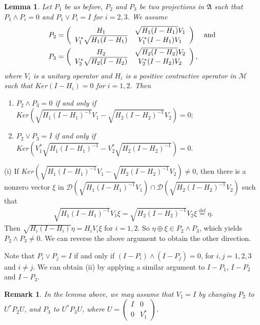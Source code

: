 \documentclass[12pt]{article}
\newtheorem{lemma}{Lemma}[section]
\newtheorem{remark}{Remark}[section]
\newcommand{\AAA}{\mathfrak A} \newcommand{\TTT}{\mathfrak T}
\newcommand{\DDD}{\mathcal D}
\newcommand{\MMM}{\mathcal M}
\begin{document}
{\begin{lemma}
Let $P_1$ be as before, $P_2$ and $P_3$ be two projections in $\AAA$
such that $P_1\wedge P_i=0$ and $P_1\vee P_i=I$ for $i=2,3$. We
assume
\begin{align*}
&P_2 = \left(\begin{array}{cc}H_1 & \sqrt{H_1 (I-H_1)}V_1 \\V_1^*
\sqrt{H_1 (I-H_1)} & V_1^{*}(I - H_1)V_1\end{array}\right)\,\,\,\,\,\hbox{ and }\\
&P_3 = \left(\begin{array}{cc}H_2 & \sqrt{H_2(I-H_2)}V_2 \\V_2^*
\sqrt{H_2(I-H_2)} & V_2^{*}(I - H_2)V_2\end{array}\right),
\end{align*}
where $V_i$ is a unitary operator and $H_i$ is a positive
contractive operator in $\MMM$ such that $Ker(I-H_i)=0$ for $i=1,2$.
Then
\begin{enumerate}
\item[(i)] $P_2 \wedge P_3 = 0$ if and only if
$Ker(\sqrt{H_1(I-H_1)^{-1}}V_1-\sqrt{H_2(I-H_2)^{-1}}V_2)=0;$
\item[(ii)] $P_2\vee P_3=I$ if and only if
$Ker(V_1^*\sqrt{H_1(I-H_1)^{-1}}-V_2^*\sqrt{H_2(I-H_2)^{-1}})=0.$
\end{enumerate}
\end{lemma}

\quad (i) If $Ker(\sqrt{H_1(I-H_1)^{-1}}V_1 -
\sqrt{H_2(I-H_2)^{-1}}V_2)  \neq 0$, then there is a nonzero vector
$\xi$ in $\DDD(\sqrt{H_1(I-H_1)^{-1}}V_1)  \cap
\DDD(\sqrt{H_2(I-H_2)^{-1}}V_2)$ such that
\begin{align*}
\sqrt{H_1(I-H_1)^{-1}}V_1 \xi =  \sqrt{H_2(I-H_2)^{-1}}V_2 \xi \overset{\text{def}}{=} \eta.
\end{align*}
Then $\sqrt{H_i(I-H_i)}\eta=H_iV_i\xi$ for  $i=1,2$. So $\eta\oplus
\xi\in P_2\wedge P_3$, which yields $P_2 \wedge P_3\neq 0$.  We can
reverse the above argument to obtain the other direction.

Note that $P_i\vee P_j=I$ if and only if  $(I - P_i)\wedge (I-
P_j)=0$, for $i,j=1,2,3$ and $i \neq j$. We can obtain (ii) by
applying a similar argument to $I-P_1$, $I-P_2$ and $I-P_3$.
\vspace{2mm}

\begin{remark}
In the lemma above, we may assume that $V_1 = I$ by changing $P_2$
to $U^{*}P_2 U$, and $P_3$ to $U^* P_3 U$, where $U =
\left(\begin{array}{cc}I & 0 \\0 & V_{1}^{*}\end{array}\right)$.
\end{remark}

}
\end{document}
